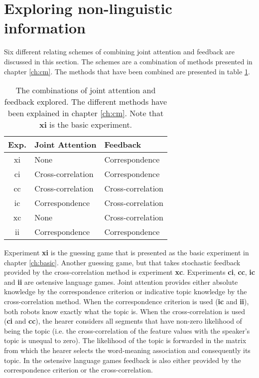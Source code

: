 \section{Exploring non-linguistic information}\label{s:feed:comb}

Six different relating schemes of combining joint attention and feedback are discussed in this section. The schemes are a combination of methods presented in chapter \ref{ch:cm}. The methods that have been combined are presented in table \ref{t:feed:comb}.

\begin{table}
\centering 
\begin{tabular}{||c|l|l||}
\hline\hline
Exp. & Joint Attention & Feedback\\\hline
xi & None & Correspondence\\\hline
ci & Cross-correlation & Correspondence\\\hline
cc & Cross-correlation & Cross-correlation\\\hline
ic & Correspondence & Cross-correlation\\\hline
xc & None & Cross-correlation\\\hline
ii & Correspondence & Correspondence\\\hline
\end{tabular}
\caption{The combinations of joint attention and feedback explored. The different methods have been explained in chapter \ref{ch:cm}. Note that {\bf xi} is the basic experiment.}
\label{t:feed:comb}
\end{table}

Experiment {\bf xi} is the guessing game that is presented as the basic experiment in chapter \ref{ch:basic}. Another guessing game, but that takes stochastic feedback provided by the cross-correlation method is experiment {\bf xc}. Experiments {\bf ci}, {\bf cc}, {\bf ic} and {\bf ii} are ostensive language games. Joint attention provides either absolute knowledge by the correspondence criterion or indicative topic knowledge by the cross-correlation method. When the correspondence criterion is used ({\bf ic} and {\bf ii}), both robots know exactly what the topic is. When the cross-correlation is used ({\bf ci} and {\bf cc}), the hearer considers all segments that have non-zero likelihood of being the topic (i.e. the cross-correlation of the feature values with the speaker's topic is unequal to zero). The likelihood of the topic is forwarded in the matrix from which the hearer selects the word-meaning association and consequently its topic. In the ostensive language games feedback is also either provided by the correspondence criterion or the cross-correlation.


